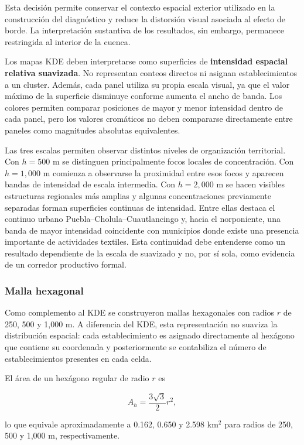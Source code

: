 \documentclass[11pt,letterpaper]{article}
\begin{document}
Esta decisión permite conservar el contexto espacial exterior utilizado en la construcción del diagnóstico y reduce la distorsión visual asociada al efecto de borde. La interpretación sustantiva de los resultados, sin embargo, permanece restringida al interior de la cuenca.

Los mapas KDE deben interpretarse como superficies de \textbf{intensidad espacial relativa suavizada}. No representan conteos directos ni asignan establecimientos a un cluster. Además, cada panel utiliza su propia escala visual, ya que el valor máximo de la superficie disminuye conforme aumenta el ancho de banda. Los colores permiten comparar posiciones de mayor y menor intensidad dentro de cada panel, pero los valores cromáticos no deben compararse directamente entre paneles como magnitudes absolutas equivalentes.

Las tres escalas permiten observar distintos niveles de organización territorial. Con $h=500$ m se distinguen principalmente focos locales de concentración. Con $h=1{,}000$ m comienza a observarse la proximidad entre esos focos y aparecen bandas de intensidad de escala intermedia. Con $h=2{,}000$ m se hacen visibles estructuras regionales más amplias y algunas concentraciones previamente separadas forman superficies continuas de intensidad. Entre ellas destaca el continuo urbano Puebla--Cholula--Cuautlancingo y, hacia el norponiente, una banda de mayor intensidad coincidente con municipios donde existe una presencia importante de actividades textiles. Esta continuidad debe entenderse como un resultado dependiente de la escala de suavizado y no, por sí sola, como evidencia de un corredor productivo formal.

\subsubsection{Malla hexagonal}

Como complemento al KDE se construyeron mallas hexagonales con radios $r$ de 250, 500 y 1,000 m. A diferencia del KDE, esta representación no suaviza la distribución espacial: cada establecimiento es asignado directamente al hexágono que contiene su coordenada y posteriormente se contabiliza el número de establecimientos presentes en cada celda.

El área de un hexágono regular de radio $r$ es

\[
A_h=\frac{3\sqrt{3}}{2}r^2,
\]

lo que equivale aproximadamente a 0.162, 0.650 y 2.598 km$^2$ para radios de 250, 500 y 1,000 m, respectivamente.
\end{document}
